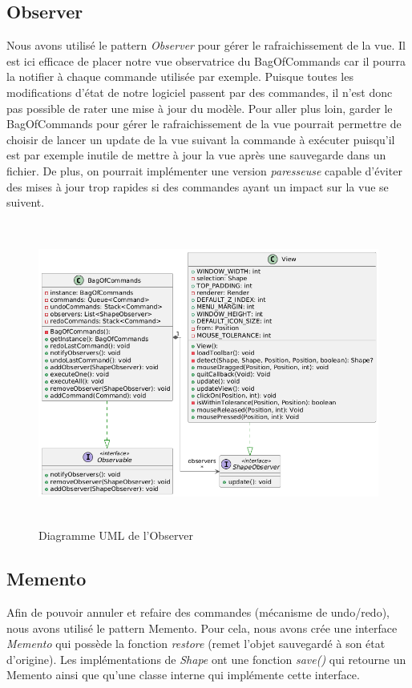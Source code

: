 \documentclass{article}
\begin{document}
\subsection{Observer}
Nous avons utilisé le pattern \textit{Observer} pour gérer le rafraichissement de la vue. Il est ici efficace de placer notre vue observatrice du BagOfCommands
car il pourra la notifier à chaque commande utilisée par exemple. Puisque toutes les modifications d'état de notre logiciel passent par des commandes, il n'est 
donc pas possible de rater une mise à jour du modèle. Pour aller plus loin, garder le BagOfCommands pour gérer le rafraichissement de la vue pourrait permettre 
de choisir de lancer un update de la vue suivant la commande à exécuter puisqu'il est par exemple inutile de mettre à jour la vue après une sauvegarde dans un fichier.
De plus, on pourrait implémenter une version \textit{paresseuse} capable d'éviter des mises à jour trop rapides si des commandes ayant un impact sur la vue se suivent.
\begin{figure}[h]
    \centering
    \includegraphics[width=\textwidth,height=10.0cm,keepaspectratio]{observer.png}
    \caption{Diagramme UML de l'Observer}
    \label{Observer}
\end{figure}
\FloatBarrier

\subsection{Memento}
Afin de pouvoir annuler et refaire des commandes (mécanisme de undo/redo), nous avons utilisé le pattern Memento.
Pour cela, nous avons crée une interface \textit{Memento} qui possède la fonction \textit{restore} (remet l'objet sauvegardé à son état d'origine).
Les implémentations de \textit{Shape} ont une fonction \textit{save()} qui retourne un Memento ainsi que qu'une classe interne qui implémente cette interface.
\end{document}
